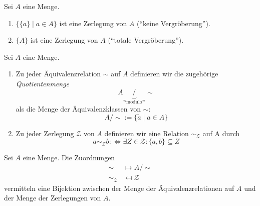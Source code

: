 \documentclass[../../main.tex]{subfiles}
\begin{document}
\begin{bsp}\label{1.3.4}
Sei $A$ eine Menge.
\begin{enumerate}[\normalfont(a)]
\item $\{\{a\}\mid a\in A\}$ ist eine Zerlegung von $A$ ("`keine Vergröberung"').
\item $\{A\}$ ist eine Zerlegung von $A$ ("`totale Vergröberung"').
\end{enumerate}
\end{bsp}

\begin{df}\label{1.3.5}
Sei $A$ eine Menge.
\begin{enumerate}[\normalfont(a)]
\item
Zu jeder Äquivalenzrelation $\sim$ auf $A$ definieren wir die zugehörige \emph{Quotientenmenge}
$$A\underbrace{/}_\text{"`modulo"'}\text{$\sim$}$$
als die Menge der Äquivalenzklassen von $\sim$:
$$A/\text{$\sim$}:=\{\widetilde a\mid a\in A\}$$
\item
Zu jeder Zerlegung $\mathcal Z$ von $A$ definieren wir eine Relation $\sim_\mathcal Z$ auf A durch
$$a\sim_\mathcal Zb:\iff\exists Z\in\mathcal Z:\{a,b\}\subseteq Z$$
\end{enumerate}
\end{df}

\begin{sat}\text{\rm[$\to$\ref{1.2.7}]} \label{1.3.6} Sei $A$ eine Menge. Die Zuordnungen
\begin{align*}
\sim&\mapsto A/\text{$\sim$}\\
\sim_\mathcal Z&\mapsfrom\mathcal Z
\end{align*}
vermitteln eine Bijektion zwischen der Menge der Äquivalenzrelationen auf $A$ und der Menge der Zerlegungen von $A$.
\end{sat}
\end{document}
